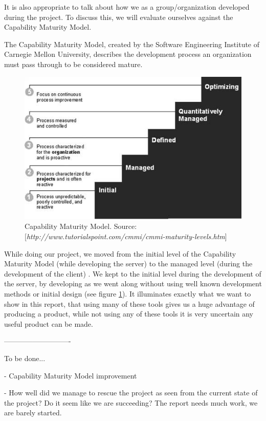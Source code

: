 It is also appropriate to talk about how we as a group/organization developed during the project. To discuss this, we will evaluate ourselves against the Capability Maturity Model.

The Capability Maturity Model, created by the Software Engineering Institute of Carnegie Mellon University, describes the development process an organization must pass through to be considered mature.

\begin{figure}[t]
  \includegraphics[width=\textwidth]{illustrations/CMM.jpg}
  \caption{Capability Maturity Model. Source: [\textit{http://www.tutorialspoint.com/cmmi/cmmi-maturity-levels.htm}]}
  \label{fig:Capability_Maturity_Model}
\end{figure}

While doing our project, we moved from the initial level of the Capability Maturity Model (while developing the server) to the managed level (during the development of the client) \cite[p. 242]{PM}. We kept to the initial level during the development of the server, by developing as we went along without using well known development methods or initial design (see figure \ref{fig:Capability_Maturity_Model}). It illuminates exactly what we want to show in this report, that using many of these tools gives us a huge advantage of producing a product, while not using any of these tools it is very uncertain any useful product can be made.

----------------------------

To be done...

- Capability Maturity Model improvement

- How well did we manage to rescue the project as seen from the current state of the project? Do it seem like we are succeeding? The report needs much work, we are barely started.
\newpage